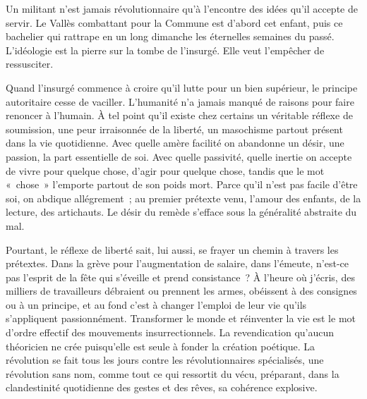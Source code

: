 \documentclass[french,twoside]{book} %
\begin{document}
\noindent Un militant n’est jamais révolutionnaire qu’à l’encontre des idées qu’il accepte de servir. Le Vallès combattant pour la Commune est d’abord cet enfant, puis ce bachelier qui rattrape en un long dimanche les éternelles semaines du passé. L’idéologie est la pierre sur la tombe de l’insurgé. Elle veut l’empêcher de ressusciter.\par
Quand l’insurgé commence à croire qu’il lutte pour un bien supérieur, le principe autoritaire cesse de vaciller. L’humanité n’a jamais manqué de raisons pour faire renoncer à l’humain. À tel point qu’il existe chez certains un véritable réflexe de soumission, une peur irraisonnée de la liberté, un masochisme partout présent dans la vie quotidienne. Avec quelle amère facilité on abandonne un désir, une passion, la part essentielle de soi. Avec quelle passivité, quelle inertie on accepte de vivre pour quelque chose, d’agir pour quelque chose, tandis que le mot « chose » l’emporte partout de son poids mort. Parce qu’il n’est pas facile d’être soi, on abdique allégrement ; au premier prétexte venu, l’amour des enfants, de la lecture, des artichauts. Le désir du remède s’efface sous la généralité abstraite du mal.\par
Pourtant, le réflexe de liberté sait, lui aussi, se frayer un chemin à travers les prétextes. Dans la grève pour l’augmentation de salaire, dans l’émeute, n’est-ce pas l’esprit de la fête qui s’éveille et prend consistance ? À l’heure où j’écris, des milliers de travailleurs débraient ou prennent les armes, obéissent à des consignes ou à un principe, et au fond c’est à changer l’emploi de leur vie qu’ils s’appliquent passionnément. Transformer le monde et réinventer la vie est le mot d’ordre effectif des mouvements insurrectionnels. La revendication qu’aucun théoricien ne crée puisqu’elle est seule à fonder la création poétique. La révolution se fait tous les jours contre les révolutionnaires spécialisés, une révolution sans nom, comme tout ce qui ressortit du vécu, préparant, dans la clandestinité quotidienne des gestes et des rêves, sa cohérence explosive.\par
\end{document}
